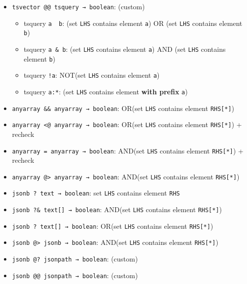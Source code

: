 \documentclass[
]{article}
\providecommand{\tightlist}{%
  \setlength{\itemsep}{0pt}\setlength{\parskip}{0pt}}
\begin{document}
\begin{itemize}
\tightlist
\item
  \texttt{tsvector\ @@\ tsquery\ →\ boolean}: (custom)

  \begin{itemize}
  \tightlist
  \item
    tsquery \texttt{a\ \textbar{}\ b}: (set \texttt{LHS} contains
    element \texttt{a}) OR (set \texttt{LHS} contains element
    \texttt{b})
  \item
    tsquery \texttt{a\ \&\ b}: (set \texttt{LHS} contains element
    \texttt{a}) AND (set \texttt{LHS} contains element \texttt{b})
  \item
    tsquery \texttt{!a}: NOT(set \texttt{LHS} contains element
    \texttt{a})
  \item
    tsquery \texttt{a:*\textquotesingle{}}: (set \texttt{LHS} contains
    element \textbf{with prefix} \texttt{a})
  \end{itemize}
\item
  \texttt{anyarray\ \&\&\ anyarray\ →\ boolean}: OR(set \texttt{LHS}
  contains element \texttt{RHS{[}*{]}})
\item
  \texttt{anyarray\ \textless{}@\ anyarray\ →\ boolean}: OR(set
  \texttt{LHS} contains element \texttt{RHS{[}*{]}}) + recheck
\item
  \texttt{anyarray\ =\ anyarray\ →\ boolean}: AND(set \texttt{LHS}
  contains element \texttt{RHS{[}*{]}}) + recheck
\item
  \texttt{anyarray\ @\textgreater{}\ anyarray\ →\ boolean}: AND(set
  \texttt{LHS} contains element \texttt{RHS{[}*{]}})
\item
  \texttt{jsonb\ ?\ text\ →\ boolean}: set \texttt{LHS} contains element
  \texttt{RHS}
\item
  \texttt{jsonb\ ?\&\ text{[}{]}\ →\ boolean}: AND(set \texttt{LHS}
  contains element \texttt{RHS{[}*{]}})
\item
  \texttt{jsonb\ ?\textbar{}\ text{[}{]}\ →\ boolean}: OR(set
  \texttt{LHS} contains element \texttt{RHS{[}*{]}})
\item
  \texttt{jsonb\ @\textgreater{}\ jsonb\ →\ boolean}: AND(set
  \texttt{LHS} contains element \texttt{RHS{[}*{]}})
\item
  \texttt{jsonb\ @?\ jsonpath\ →\ boolean}: (custom)
\item
  \texttt{jsonb\ @@\ jsonpath\ →\ boolean}: (custom)


\end{itemize}
\end{document}
